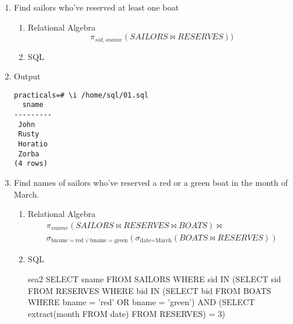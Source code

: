 \begin{enumerate}
      \item  Find sailors who've reserved at least one boat
            \begin{enumerate}
                  \item Relational Algebra
                        \begin{equation*}
                              \pi_{sid, sname}(SAILORS \bowtie RESERVES))
                        \end{equation*}

                  \item  SQL \linebreak {}
            \end{enumerate}

            \pagebreak

      \item Output
            \begin{lstlisting}[style=output]
practicals=# \i /home/sql/01.sql 
  sname  
---------
 John
 Rusty
 Horatio
 Zorba
(4 rows)
            \end{lstlisting}
            \vspace{1cm}

      \item Find names of sailors who've reserved a red or a green boat in the month of March.
            \begin{enumerate}
                  \item Relational Algebra
                        \begin{multline*}
                              \pi_{sname}(SAILORS \bowtie RESERVES \bowtie BOATS) \bowtie \\
                              \sigma_{\text{bname} = \text{red} \lor \text{bname} = \text{green}}(\sigma_{\text{date} = \text{March}}(BOATS \bowtie RESERVES))
                        \end{multline*}

                  \item  SQL
                        \begin{sqlQuery}{sea2}
                            SELECT sname
                            FROM SAILORS
                            WHERE sid IN
                                (SELECT sid
                                FROM RESERVES
                                WHERE bid IN
                                    (SELECT bid
                                    FROM BOATS
                                    WHERE bname = 'red' OR bname = 'green')
                                AND (SELECT extract(month FROM date) FROM RESERVES) = 3)
                    \end{sqlQuery}


\end{enumerate}
\end{enumerate}
